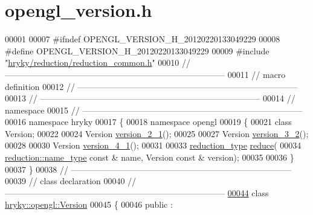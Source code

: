 \hypertarget{opengl__version_8h_source}{\section{opengl\-\_\-version.\-h}
}

\begin{DoxyCode}
00001 
00007 \textcolor{preprocessor}{#ifndef OPENGL\_VERSION\_H\_20120220133049229}
00008 \textcolor{preprocessor}{}\textcolor{preprocessor}{#define OPENGL\_VERSION\_H\_20120220133049229}
00009 \textcolor{preprocessor}{}\textcolor{preprocessor}{#include "\hyperlink{reduction__common_8h}{hryky/reduction/reduction_common.h}"}
00010 \textcolor{comment}{//
      ------------------------------------------------------------------------------}
00011 \textcolor{comment}{// macro definition}
00012 \textcolor{comment}{//
      ------------------------------------------------------------------------------}
00013 \textcolor{comment}{//
      ------------------------------------------------------------------------------}
00014 \textcolor{comment}{// namespace}
00015 \textcolor{comment}{//
      ------------------------------------------------------------------------------}
00016 \textcolor{keyword}{namespace }hryky
00017 \{
00018 \textcolor{keyword}{namespace }opengl
00019 \{
00021     \textcolor{keyword}{class }Version;
00022 
00024     Version \hyperlink{namespacehryky_1_1opengl_ad642afa7961d36eaceb81c1c75b9476d}{version_2_1}();
00025 
00027     Version \hyperlink{namespacehryky_1_1opengl_add161d3235f18e84c734bf3a28c2f80e}{version_3_2}();
00028 
00030     Version \hyperlink{namespacehryky_1_1opengl_a09e05bdbe6b5618bc752e8f9933722f0}{version_4_1}();
00031 
00033     \hyperlink{namespacehryky_a343a9a4c36a586be5c2693156200eadc}{reduction_type} \hyperlink{namespacehryky_1_1opengl_a1f50a28d54b84ea181f698a67dca08e1}{reduce}(
00034         \hyperlink{namespacehryky_1_1reduction_ac686c30a4c8d196bbd0f05629a6b921f}{reduction::name_type} \textcolor{keyword}{const} & name, Version \textcolor{keyword}{const} & version);
00035 
00036 \}
00037 \}
00038 \textcolor{comment}{//
      ------------------------------------------------------------------------------}
00039 \textcolor{comment}{// class declaration}
00040 \textcolor{comment}{//
      ------------------------------------------------------------------------------}
\hypertarget{opengl__version_8h_source_l00044}{}\hyperlink{classhryky_1_1opengl_1_1_version}{00044} \textcolor{comment}{}\textcolor{keyword}{class }\hyperlink{classhryky_1_1opengl_1_1_version}{hryky::opengl::Version}
00045 \{
00046 \textcolor{keyword}{public} :

\end{DoxyCode}
